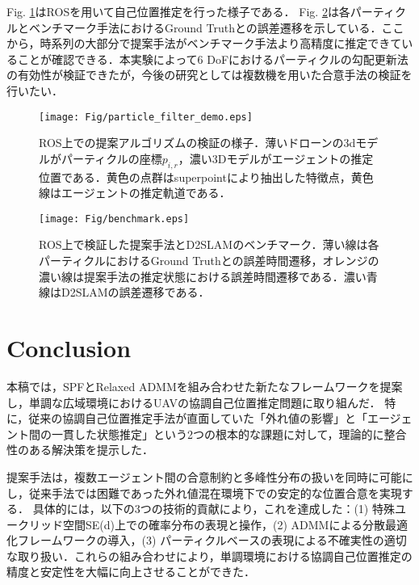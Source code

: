\documentclass[a4paper,fleqn,10pt,twocolumn]{SICE_ISCS}
\begin{document}
Fig. \ref{fig:ros_demo}はROSを用いて自己位置推定を行った様子である．
Fig. \ref{fig:benchmark}は各パーティクルとベンチマーク手法におけるGround Truthとの誤差遷移を示している．ここから，時系列の大部分で提案手法がベンチマーク手法より高精度に推定できていることが確認できる．本実験によって6 DoFにおけるパーティクルの勾配更新法の有効性が検証できたが，今後の研究としては複数機を用いた合意手法の検証を行いたい．

\begin{figure}[t]
	\begin{center}
		\texttt{[image: Fig/particle\_filter\_demo.eps]}
		\caption{ROS上での提案アルゴリズムの検証の様子．薄いドローンの3dモデルがパーティクルの座標$p_{i,r}$，濃い3Dモデルがエージェントの推定位置である．黄色の点群はsuperpointにより抽出した特徴点，黄色線はエージェントの推定軌道である．}
		\label{fig:ros_demo}
	\end{center}
	\vspace{-2mm}
\end{figure}

\begin{figure}[t]
	\begin{center}
		\texttt{[image: Fig/benchmark.eps]}
		\caption{ROS上で検証した提案手法とD2SLAMのベンチマーク．薄い線は各パーティクルにおけるGround Truthとの誤差時間遷移，オレンジの濃い線は提案手法の推定状態における誤差時間遷移である．濃い青線はD2SLAMの誤差遷移である．}
		\label{fig:benchmark}
	\end{center}
	\vspace{-2mm}
\end{figure}

\section{Conclusion}

本稿では，SPFとRelaxed ADMMを組み合わせた新たなフレームワークを提案し，単調な広域環境におけるUAVの協調自己位置推定問題に取り組んだ．
特に，従来の協調自己位置推定手法が直面していた「外れ値の影響」と「エージェント間の一貫した状態推定」という2つの根本的な課題に対して，理論的に整合性のある解決策を提示した．

提案手法は，複数エージェント間の合意制約と多峰性分布の扱いを同時に可能にし，従来手法では困難であった外れ値混在環境下での安定的な位置合意を実現する．
具体的には，以下の3つの技術的貢献により，これを達成した：(1) 特殊ユークリッド空間SE(d)上での確率分布の表現と操作，(2) ADMMによる分散最適化フレームワークの導入，(3) パーティクルベースの表現による不確実性の適切な取り扱い．これらの組み合わせにより，単調環境における協調自己位置推定の精度と安定性を大幅に向上させることができた．
\end{document}
